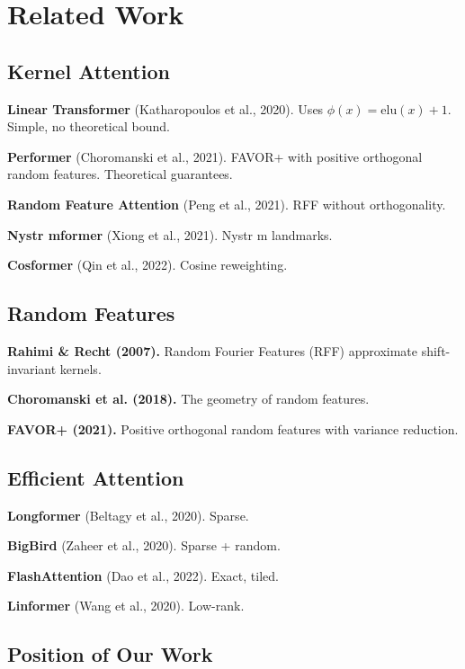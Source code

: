 
\section{Related Work}

\subsection{Kernel Attention}

\textbf{Linear Transformer} (Katharopoulos et al., 2020). Uses $\phi(x) = \text{elu}(x) + 1$. 
Simple, no theoretical bound.

\textbf{Performer} (Choromanski et al., 2021). FAVOR+ with positive orthogonal 
random features. Theoretical guarantees.

\textbf{Random Feature Attention} (Peng et al., 2021). RFF without orthogonality.

\textbf{Nystr mformer} (Xiong et al., 2021). Nystr m landmarks.

\textbf{Cosformer} (Qin et al., 2022). Cosine reweighting.

\subsection{Random Features}

\textbf{Rahimi \& Recht (2007).} Random Fourier Features (RFF) approximate 
shift-invariant kernels.

\textbf{Choromanski et al. (2018).} The geometry of random features.

\textbf{FAVOR+ (2021).} Positive orthogonal random features with variance 
reduction.

\subsection{Efficient Attention}

\textbf{Longformer} (Beltagy et al., 2020). Sparse.

\textbf{BigBird} (Zaheer et al., 2020). Sparse + random.

\textbf{FlashAttention} (Dao et al., 2022). Exact, tiled.

\textbf{Linformer} (Wang et al., 2020). Low-rank.

\subsection{Position of Our Work}

